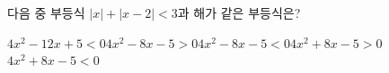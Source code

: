 다음 중 부등식 $|x|+|x-2|<3$과 해가 같은 부등식은?
\begin{choices32}{$4x^2-12x+5<0$}{$4x^2-8x-5>0$}{$4x^2-8x-5<0$}{$4x^2+8x-5>0$}{$4x^2+8x-5<0$}\end{choices32}
